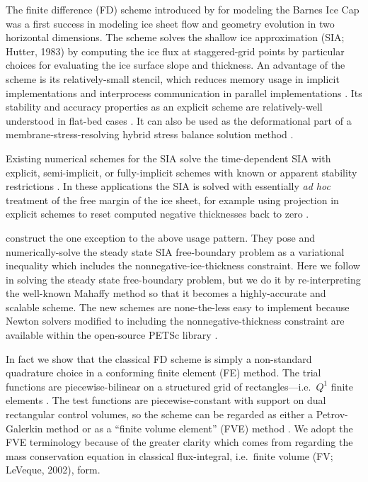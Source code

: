 \documentclass[twocolumn,letterpaper]{igs}
\begin{document}
The finite difference (FD) scheme introduced by \cite{Mahaffy1976} for modeling the Barnes Ice Cap was a first success in modeling ice sheet flow and geometry evolution in two horizontal dimensions.  The scheme solves the shallow ice approximation (SIA; Hutter, 1983)\nocite{Hutter1983} by computing the ice flux at staggered-grid points by particular choices for evaluating the ice surface slope and thickness.  An advantage of the scheme is its relatively-small stencil, which reduces memory usage in implicit implementations \citep{HindmarshPayne1996,Mahaffy1976} and interprocess communication in parallel implementations \citep{Bueleretal2007}.  Its stability and accuracy properties as an explicit scheme are relatively-well understood in flat-bed cases \citep{Bueleretal2005,HindmarshPayne1996}.  It can also be used as the deformational part of a membrane-stress-resolving hybrid stress balance solution method \citep{BuelerBrown2009}.

Existing numerical schemes for the SIA solve the time-dependent SIA with explicit, semi-implicit, or fully-implicit schemes with known or apparent stability restrictions \citep[among others]{Bueleretal2005,EgholmNielsen2010,HindmarshPayne1996,Huybrechtsetal1996,
JaroschSchoofAnslow2013}.  In these applications the SIA is solved with essentially \emph{ad hoc} treatment of the free margin of the ice sheet, for example using projection in explicit schemes to reset computed negative thicknesses back to zero \citep{Bueleretal2005,JaroschSchoofAnslow2013}.

\cite{JouvetBueler2012} construct the one exception to the above usage pattern.  They pose and numerically-solve the steady state SIA free-boundary problem as a variational inequality \citep{KinderlehrerStampacchia1980} which includes the nonnegative-ice-thickness constraint.  Here we follow \cite{JouvetBueler2012} in solving the steady state free-boundary problem, but we do it by re-interpreting the well-known Mahaffy method so that it becomes a highly-accurate and scalable scheme.  The new schemes are none-the-less easy to implement because Newton solvers modified to including the nonnegative-thickness constraint \citep{BensonMunson2006} are available within the open-source PETSc library \citep{Balayetal2014}.

In fact we show that the classical \cite{Mahaffy1976} FD scheme is simply a non-standard quadrature choice in a conforming finite element (FE) method.  The trial functions are piecewise-bilinear on a structured grid of rectangles---i.e.~$Q^1$ finite elements \citep{Elmanetal2005}.  The test functions are piecewise-constant with support on dual rectangular control volumes, so the scheme can be regarded as either a Petrov-Galerkin method \citep{Elmanetal2005} or as a ``finite volume element'' (FVE) method \citep{Cai1990,EwingLinLin2002}.  We adopt the FVE terminology because of the greater clarity which comes from regarding the mass conservation equation in classical flux-integral, i.e.~finite volume (FV; LeVeque, 2002),\nocite{LeVeque2002} form.
\end{document}
